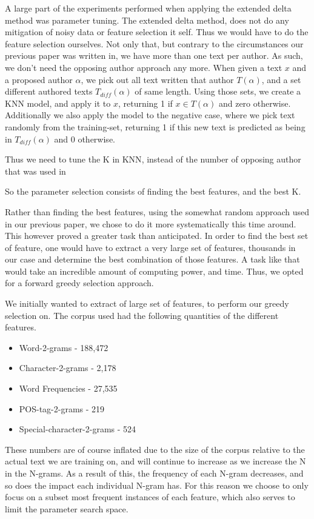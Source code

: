 A large part of the experiments performed when applying the extended delta
method was parameter tuning. The extended delta method, does not do any
mitigation of noisy data or feature selection it self. Thus we would have
to do the feature selection ourselves. Not only that, but contrary to the
circumstances our previous paper \cite{US} was written in, we have more than
one text per author. As such, we don't need the opposing author approach any
more. When given a text $x$ and a proposed author $\alpha$, we pick out all
text written that author $T(\alpha)$, and a set different authored texts
$T_{diff}(\alpha)$ of same length. Using those sets, we create a \gls{KNN}
model, and apply it to $x$, returning 1 if $x \in T(\alpha)$ and zero otherwise.
Additionally we also apply the model to the negative case, where we pick text
randomly from the training-set, returning 1 if this new text is predicted as
being in $T_{diff}(\alpha)$ and 0 otherwise.

Thus we need to tune the K in \gls{KNN}, instead of the number of opposing
author that was used in \cite{US}

So the parameter selection consists of finding the best features, and the best
K.

Rather than finding the best features, using the somewhat random approach used
in our previous paper\cite{US}, we chose to do it more systematically this time
around. This however proved a greater task than anticipated. In order to find
the best set of feature, one would have to extract a very large set of features,
thousands in our case and determine the best combination of those features. A
task like that would take an incredible amount of computing power, and time.
Thus, we opted for a forward greedy selection approach.

We initially wanted to extract of large set of features, to perform our greedy
selection on. The corpus used had the following quantities of the different
features.

\begin{itemize}
    \item Word-2-grams - 188,472
    \item Character-2-grams - 2,178
    \item Word Frequencies - 27,535
    \item \gls{POS}-tag-2-grams - 219
    \item Special-character-2-grams - 524
\end{itemize}

These numbers are of course inflated due to the size of the corpus relative
to the actual text we are training on, and will continue to increase as we
increase the N in the N-grams. As a result of this, the frequency of each N-gram
decreases, and so does the impact each individual N-gram has. For this reason we
choose to only focus on a subset most frequent instances of each feature, which
also serves to limit the parameter search space.


